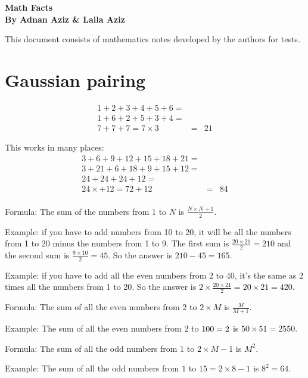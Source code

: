 \documentclass[fullpage,twocolumn]{article}
\begin{document}

\begin{center}
{\Large \bf Math Facts} \\
{\bf By Adnan Aziz \& Laila Aziz}

\end{center}


This document consists of mathematics notes developed by the authors for
tests.



\section{Gaussian pairing}
{\color{blue}
\begin{eqnarray*}
1 + 2 + 3 + 4 + 5 + 6 = \\
1 + 6 + 2 + 5 + 3 + 4 = \\
7 + 7 + 7 = 7 \times 3 & = & 21
\end{eqnarray*}
}

This works in many places:
\begin{eqnarray*}
3 + 6 + 9 + 12 + 15 + 18 + 21 = \\
3 + 21 + 6 + 18 + 9 + 15 + 12 = \\
24 + 24 + 24 + 12 = \\
24\times + 12 = 72 + 12 & = & 84 \\
\end{eqnarray*}

Formula: The sum of the numbers from 1 to $N$ is $\frac{N \times {N+1}}{2}$.

Example: if you have to add numbers from 10 to 20, it will
be all the numbers from 1 to 20 minus the numbers from 1 to 9.
The first sum is $\frac{20 \times 21}{2} = 210$ and the second
sum is $\frac{9 \times 10 }{2} = 45$. So the answer
is $210 - 45 = 165$.

Example: if you have to add all the even numbers from 2 to 40,
it's the same as 2 times all the numbers from 1 to 20.
So the answer is $2 \times \frac{20\times 21}{2} = 20\times 21 = 420$.

Formula: The sum of all the even numbers from $2$ to $2\times M$ is $\frac{M}{M+1}$.

Example: The sum of all the even numbers from $2$ to $100 = 2 \time 50$ is
$50 \times 51 =  2550$.

Formula: The sum of all the odd numbers from $1$ to $2 \times M  - 1$ is $M^2$.

Example: The sum of all the odd numbers from $1$ to $15 = 2 \times 8 - 1 $ is
$8^2 = 64$.
\end{document}
